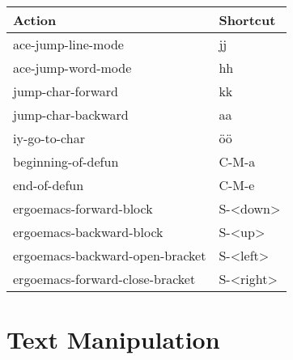 \documentclass[english]{rcalibritwocolumn}
\begin{document}
\begin{center}
\begin{tabular}{ll}
 \textbf{Action}                  &  \textbf{Shortcut}  \\
\hline
 ace-jump-line-mode               &  jj                 \\
 ace-jump-word-mode               &  hh                 \\
 jump-char-forward                &  kk                 \\
 jump-char-backward               &  aa                 \\
 iy-go-to-char                    &  öö                 \\
 beginning-of-defun               &  C-M-a              \\
 end-of-defun                     &  C-M-e              \\
\hline
 ergoemacs-forward-block          &  S-<down>           \\
 ergoemacs-backward-block         &  S-<up>             \\
 ergoemacs-backward-open-bracket  &  S-<left>           \\
 ergoemacs-forward-close-bracket  &  S-<right>          \\
\end{tabular}
\end{center}
\section{Text Manipulation}
\label{sec-4}
\end{document}
